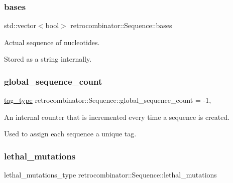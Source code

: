 \subsubsection{\texorpdfstring{bases}{bases}}
{\footnotesize\ttfamily std\+::vector$<$bool$>$ retrocombinator\+::\+Sequence\+::bases\hspace{0.3cm}{\ttfamily [private]}}



Actual sequence of nucleotides. 

Stored as a string internally. \mbox{\label{classretrocombinator_1_1Sequence_a486f1b680452f7162ee9a895c2871f92}} 
\subsubsection{\texorpdfstring{global\+\_\+sequence\+\_\+count}{global\_sequence\_count}}
{\footnotesize\ttfamily \hyperlink{constants_8h_afd7c6eb4293e8c4d12827609a9a34b9b}{tag\+\_\+type} retrocombinator\+::\+Sequence\+::global\+\_\+sequence\+\_\+count = -\/1\hspace{0.3cm}{\ttfamily [static]}, {\ttfamily [private]}}



An internal counter that is incremented every time a sequence is created. 

Used to assign each sequence a unique tag. \mbox{\label{classretrocombinator_1_1Sequence_af5798b014aaeb7573197602dafb98818}} 
\subsubsection{\texorpdfstring{lethal\+\_\+mutations}{lethal\_mutations}}
{\footnotesize\ttfamily lethal\+\_\+mutations\+\_\+type retrocombinator\+::\+Sequence\+::lethal\+\_\+mutations\hspace{0.3cm}{\ttfamily [private]}}



